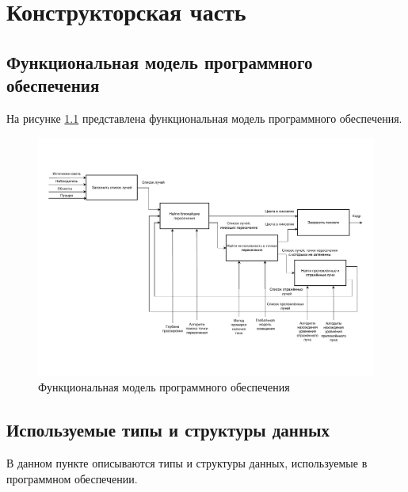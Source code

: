 \chapter{Конструкторская часть}

\section{Функциональная модель программного обеспечения}

На рисунке \ref{img:idef0_func} представлена функциональная модель программного обеспечения.

\begin{figure}[h]
	\begin{center}
		\includegraphics[width=\linewidth]{img/idef0_func.pdf}
	\end{center}
	\captionsetup{justification=centering}
	\caption{Функциональная модель программного обеспечения}
	\label{img:idef0_func}
\end{figure}


\clearpage

\section{Используемые типы и структуры данных}

В данном пункте описываются типы и структуры данных, используемые в программном обеспечении.

